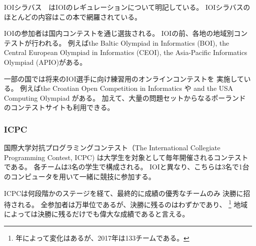 IOIシラバス\cite{iois}　はIOIのレギュレーションについて明記している。
IOIシラバスのほとんどの内容はこの本で網羅されている。

IOIの参加者は国内コンテストを通じ選抜される。
IOIの前、各地の地域別コンテストが行われる。
例えばthe Baltic Olympiad in Informatics (BOI),
the Central European Olympiad in Informatics (CEOI),
the Asia-Pacific Informatics Olympiad (APIO)がある。

一部の国では将来のIOI選手に向け練習用のオンラインコンテストを
実施している。
例えばthe Croatian Open Competition in Informatics \cite{coci}や
and the USA Computing Olympiad \cite{usaco}がある。
加えて、大量の問題セットからなるポーランドのコンテストサイトも利用できる\cite{main}。

\subsubsection{ICPC}


\begin{comment}
The International Collegiate Programming Contest (ICPC)
is an annual programming contest for university students.
Each team in the contest consists of three students,
and unlike in the IOI, the students work together;
there is only one computer available for each team.

The ICPC consists of several stages, and finally the
best teams are invited to the World Finals.
While there are tens of thousands of participants
in the contest, there are only a small number\footnote{The exact number of final
slots varies from year to year; in 2017, there were 133 final slots.} of final slots available,
so even advancing to the finals
is a great achievement in some regions.
\end{comment}

国際大学対抗プログラミングコンテスト（The International Collegiate Programming Contest, ICPC)
は大学生を対象として毎年開催されるコンテストである。
各チームは3名の学生で構成される。
IOIと異なり、こちらは3名で1台のコンピュータを用いて一緒に競技に参加する。

ICPCは何段階かのステージを経て、最終的に成績の優秀なチームのみ
決勝に招待される。
全参加者は万単位であるが、決勝に残るのはわずかであり、
\footnote{年によって変化はあるが、2017年は133チームである。}
地域によっては決勝に残るだけでも偉大な成績であると言える。

\begin{comment}
In each ICPC contest, the teams have five hours of time to
solve about ten algorithm problems.
A solution to a problem is accepted only if it solves
all test cases efficiently.
During the contest, competitors may view the results of other teams,
but for the last hour the scoreboard is frozen and it
is not possible to see the results of the last submissions.

The topics that may appear at the ICPC are not so well
specified as those at the IOI.
In any case, it is clear that more knowledge is needed
at the ICPC, especially more mathematical skills.
\end{comment}

